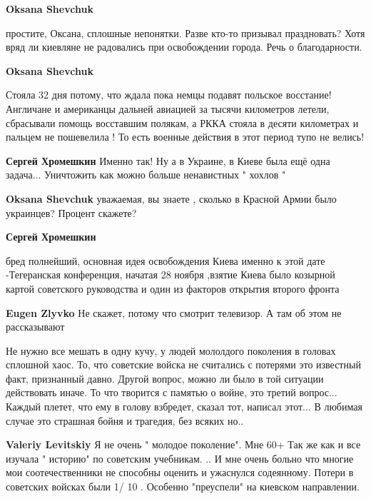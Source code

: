 \begin{itemize}
\begin{itemize}
\begin{itemize}
\textbf{Oksana Shevchuk} 

простите, Оксана, сплошные непонятки. Разве кто-то призывал праздновать? Хотя
вряд ли киевляне не радовались при освобождении города. Речь о благодарности.

\textbf{Oksana Shevchuk} 

Стояла 32 дня потому, что ждала пока немцы подавят польское восстание!
Англичане и американцы дальней авиацией за тысячи километров летели, сбрасывали
помощь восставшим полякам, а РККА стояла в десяти километрах и пальцем не
пошевелила ! То есть военные действия в этот период тупо не велись!

\textbf{Сергей Хромешкин}
Именно так!
Ну а в Украине, в Киеве была ещё одна задача...
Уничтожить как можно больше ненавистных " хохлов "

\textbf{Oksana Shevchuk} уважаемая, вы знаете , сколько в Красной Армии было украинцев? Процент скажете?

\textbf{Сергей Хромешкин} 

бред полнейший, основная идея освобождения Киева именно к этой дате
-Тегеранская конференция, начатая 28 ноября ,взятие Киева было козырной картой
советского руководства и один из факторов открытия второго фронта

\textbf{Eugen Zlyvko} Не скажет, потому что смотрит телевизор. А там об этом не рассказывают

\end{itemize} %


Не нужно все мешать в одну кучу, у людей мололдого поколения в головах сплошной
хаос. То, что советские войска не считались с потерями это известный
факт, признанный давно. Другой вопрос, можно ли было в той ситуации действовать
иначе. То что творится с памятью о войне, это третий вопрос... Каждый плетет, что
ему в голову взбредет, сказал тот, написал этот... В любимая случае это страшная
бойня и трагедия, без всяких но..

\begin{itemize} %
\textbf{Valeriy Levitskiy}
Я не очень " молодое поколение". Мне 60+
Так же как и все изучала " историю" по советским учебникам. ..
И мне очень больно что многие мои соотечественники не способны оценить и ужаснулся содеянному. Потери в советских войсках были 1/ 10 . Особенно "преуспели" на киевском направлении.
\end{itemize} %


\end{itemize}
\end{itemize}
